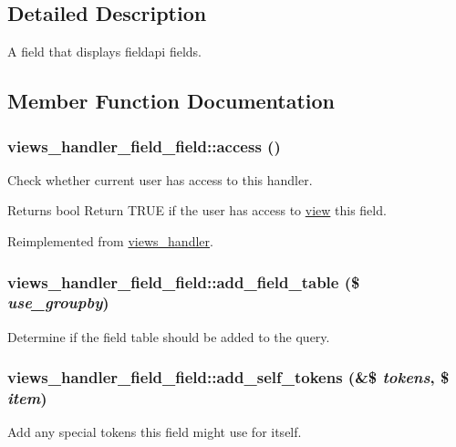 \subsection{Detailed Description}
A field that displays fieldapi fields. 

\subsection{Member Function Documentation}
\hypertarget{classviews__handler__field__field_adf074793dec71e06e0512d16415ff91b}{
\subsubsection[{access}]{\setlength{\rightskip}{0pt plus 5cm}views\_\-handler\_\-field\_\-field::access ()}}
\label{classviews__handler__field__field_adf074793dec71e06e0512d16415ff91b}
Check whether current user has access to this handler.

\begin{DoxyReturn}{Returns}
bool Return TRUE if the user has access to \hyperlink{classview}{view} this field. 
\end{DoxyReturn}


Reimplemented from \hyperlink{classviews__handler_a3f2fbfe1e0849d06ae77149412b821f6}{views\_\-handler}.\hypertarget{classviews__handler__field__field_ac42485c9db18b8b61ee25133505975c5}{
\subsubsection[{add\_\-field\_\-table}]{\setlength{\rightskip}{0pt plus 5cm}views\_\-handler\_\-field\_\-field::add\_\-field\_\-table (\$ {\em use\_\-groupby})}}
\label{classviews__handler__field__field_ac42485c9db18b8b61ee25133505975c5}
Determine if the field table should be added to the query. \hypertarget{classviews__handler__field__field_a188044611e725e210d9b538b5b91f0c9}{
\subsubsection[{add\_\-self\_\-tokens}]{\setlength{\rightskip}{0pt plus 5cm}views\_\-handler\_\-field\_\-field::add\_\-self\_\-tokens (\&\$ {\em tokens}, \/  \$ {\em item})}}
\label{classviews__handler__field__field_a188044611e725e210d9b538b5b91f0c9}
Add any special tokens this field might use for itself.

